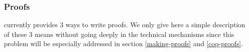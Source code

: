 



\subsubsection{Proofs}
\label{proof-short-intro}
{\focal} currently provides 3 ways to write proofs. We only give here a
simple description of these 3 means without going deeply in the
technical mechanisms since this problem will be especially addressed
in section \ref{making-proofs} and \ref{coq-proofs}. %

